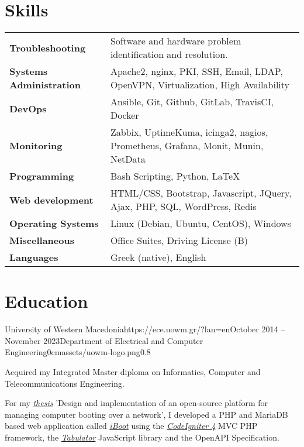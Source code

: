 \documentclass{mycv}
\begin{document}
	\section{Skills}
	\begin{tabular}{m{4.5cm} m{12.5cm}}
		\textbf{Troubleshooting}     	& Software and hardware problem identification and resolution. \\
		\textbf{Systems Administration}	& Apache2, nginx, PKI, SSH, Email, LDAP, OpenVPN, Virtualization, High Availability \\
		\textbf{DevOps}	                & Ansible, Git, Github, GitLab, TravisCI, Docker \\
  \textbf{Monitoring}         & Zabbix, UptimeKuma, icinga2, nagios, Prometheus, Grafana, Monit, Munin, NetData \\
		\textbf{Programming} 	 	   	& Bash Scripting, Python, \LaTeX \\
		\textbf{Web development}	   	& HTML/CSS, Bootstrap, Javascript, JQuery, Ajax, PHP, SQL, WordPress, Redis \\
		\textbf{Operating Systems}   	& Linux (Debian, Ubuntu, CentOS), Windows \\
		\textbf{Miscellaneous}         	& Office Suites, Driving License (B) \\
		\textbf{Languages} 			   	& Greek (native), English 
	\end{tabular}

	\section{Education}

	\begin{EntryDatedLogo}{University of Western Macedonia}{https://ece.uowm.gr/?lan=en}{October 2014 -- November 2023}{Department of Electrical and Computer Engineering}{0cm}{assets/uowm-logo.png}{0.8}
		\vspace{-0.2cm}
		\begin{Itemize}
			\item Acquired my Integrated Master diploma on Informatics, Computer and Telecommunications Engineering.
			\item For my \href{https://github.com/ChrisKar96/Thesis}{\textit{thesis}} 'Design and implementation of an open-source platform for managing computer booting over a network', I developed a PHP and MariaDB based web application called 
\href{https://github.com/ChrisKar96/iBoot-Thesis}{\textit{iBoot}} using the \href{https://codeigniter.com/}{\textit{CodeIgniter 4}} MVC PHP framework, the \href{https://tabulator.info/}{\textit{Tabulator}} JavaScript library and the OpenAPI Specification.
   \end{Itemize}
	\end{EntryDatedLogo}
\end{document}
